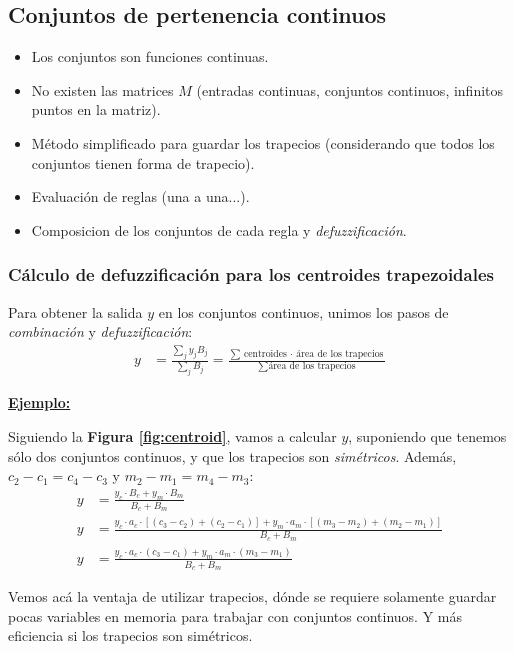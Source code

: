 \documentclass[10pt,a4paper]{article}
\begin{document}
\subsection{Conjuntos de pertenencia continuos}

\begin{itemize}
\item Los conjuntos son funciones continuas.
\item No existen las matrices $M$ (entradas continuas, conjuntos continuos, infinitos puntos en la matriz).
\item Método simplificado para guardar los trapecios (considerando que todos los conjuntos tienen forma de trapecio).
\item Evaluación de reglas (una a una...).
\item Composicion de los conjuntos de cada regla y \textit{defuzzificación}.
\end{itemize}

\subsubsection{Cálculo de defuzzificación para los centroides trapezoidales}

Para obtener la salida $y$ en los conjuntos continuos, unimos los pasos de \textit{combinación} y \textit{defuzzificación}:
\begin{align*}
y &= \frac{\sum_j y_j B_j}{\sum_j B_j} = \frac{\sum \text{centroides $\cdot$ área de los trapecios}}{\sum \text{área de los trapecios}}
\end{align*}

\underline{\textbf{Ejemplo:}}

Siguiendo la \textbf{Figura \ref{fig:centroid}}, vamos a calcular $y$, suponiendo que tenemos sólo dos conjuntos continuos, y que los trapecios son \textit{simétricos}. Además, $c_2 - c_1 = c_4 - c_3$ y $m_2 - m_1 = m_4 - m_3$:
\begin{align*}
y &= \frac{y_c \cdot B_c + y_m \cdot B_m}{B_c + B_m} \\
y &= \frac{y_c \cdot a_c \cdot [(c_3 - c_2) + (c_2 - c_1)] + y_m \cdot a_m \cdot [(m_3 - m_2) + (m_2 - m_1)]}{B_c + B_m} \\
y &= \frac{y_c \cdot a_c \cdot (c_3 - c_1) + y_m \cdot a_m \cdot (m_3 - m_1)}{B_c + B_m}
\end{align*}

Vemos acá la ventaja de utilizar trapecios, dónde se requiere solamente guardar pocas variables en memoria para trabajar con conjuntos continuos. Y más eficiencia si los trapecios son simétricos.
\end{document}
